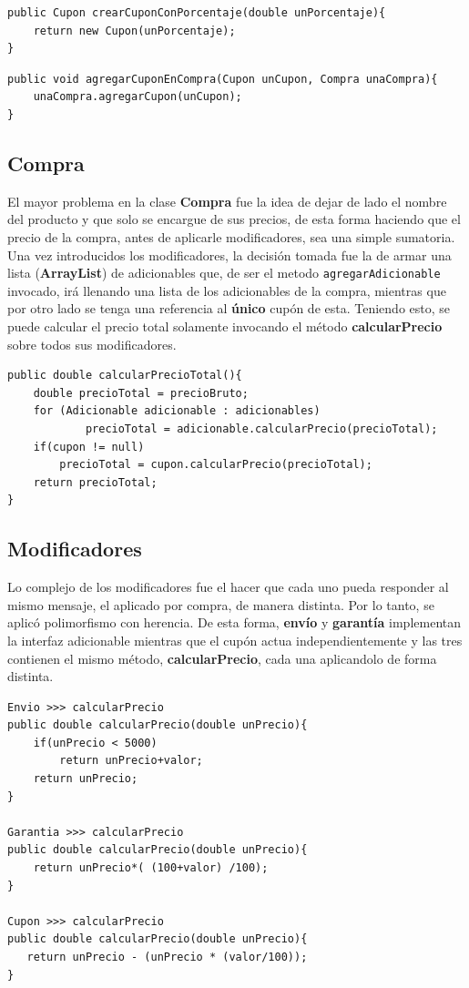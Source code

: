 \documentclass[titlepage,a4paper]{article}
\begin{document}
\begin{verbatim}
public Cupon crearCuponConPorcentaje(double unPorcentaje){
    return new Cupon(unPorcentaje);
}
\end{verbatim}

\begin{verbatim}
public void agregarCuponEnCompra(Cupon unCupon, Compra unaCompra){
    unaCompra.agregarCupon(unCupon);
}

\end{verbatim}

\subsection{Compra}
El mayor problema en la clase \textbf{Compra} fue la idea de dejar de lado el nombre del producto y que solo se encargue de sus precios, de esta forma haciendo que el precio de la compra, antes de aplicarle modificadores, sea una simple sumatoria. Una vez introducidos los modificadores, la decisión tomada fue la de armar una lista (\textbf{ArrayList}) de adicionables que, de ser el metodo \texttt{agregarAdicionable} invocado, irá llenando una lista de los adicionables de la compra, mientras que por otro lado se tenga una referencia al \textbf{único} cupón de esta. Teniendo esto, se puede calcular el precio total solamente invocando el método \textbf{calcularPrecio} sobre todos sus modificadores.

\begin{verbatim}
public double calcularPrecioTotal(){
	double precioTotal = precioBruto;
	for (Adicionable adicionable : adicionables)
			precioTotal = adicionable.calcularPrecio(precioTotal);
	if(cupon != null)
		precioTotal = cupon.calcularPrecio(precioTotal);
	return precioTotal;
}
\end{verbatim}

\subsection{Modificadores}
Lo complejo de los modificadores fue el hacer que cada uno pueda responder al mismo mensaje, el aplicado por compra, de manera distinta. Por lo tanto, se aplicó polimorfismo con herencia. De esta forma, \textbf{envío} y \textbf{garantía} implementan la interfaz adicionable mientras que el cupón actua independientemente y las tres contienen el mismo método, \textbf{calcularPrecio}, cada una aplicandolo de forma distinta. 

\begin{verbatim}
Envio >>> calcularPrecio
public double calcularPrecio(double unPrecio){
	if(unPrecio < 5000)
		return unPrecio+valor;
	return unPrecio;
}

Garantia >>> calcularPrecio
public double calcularPrecio(double unPrecio){
	return unPrecio*( (100+valor) /100);
}

Cupon >>> calcularPrecio
public double calcularPrecio(double unPrecio){
   return unPrecio - (unPrecio * (valor/100));
}
\end{verbatim}
\end{document}
